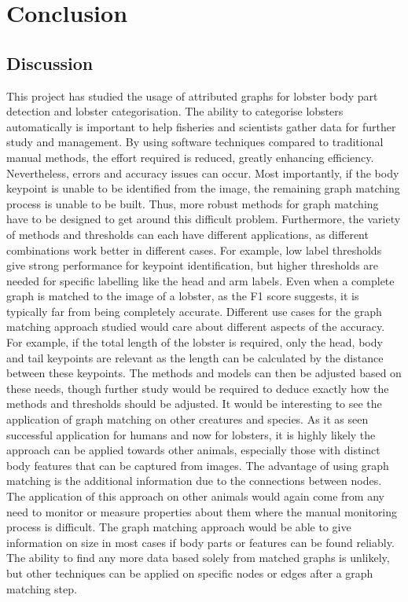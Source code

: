\section{Conclusion}
\newcommand{\comment}[1]{}

\subsection{Discussion}
This project has studied the usage of attributed graphs for lobster body part detection and lobster categorisation. The ability to categorise lobsters automatically is important to help fisheries and scientists gather data for further study and management. 
\n
By using software techniques compared to traditional manual methods, the effort required is reduced, greatly enhancing efficiency. Nevertheless, errors and accuracy issues can occur. Most importantly, if the body keypoint is unable to be identified from the image, the remaining graph matching process is unable to be built. Thus, more robust methods for graph matching have to be designed to get around this difficult problem. Furthermore, the variety of methods and thresholds can each have different applications, as different combinations work better in different cases. For example, low label thresholds give strong performance for keypoint identification, but higher thresholds are needed for specific labelling like the head and arm labels. Even when a complete graph is matched to the image of a lobster, as the F1 score suggests, it is typically far from being completely accurate. Different use cases for the graph matching approach studied would care about different aspects of the accuracy. For example, if the total length of the lobster is required, only the head, body and tail keypoints are relevant as the length can be calculated by the distance between these keypoints. The methods and models can then be adjusted based on these needs, though further study would be required to deduce exactly how the methods and thresholds should be adjusted. 
\n
It would be interesting to see the application of graph matching on other creatures and species. As it as seen successful application for humans \cite{human-pose, human-skeleton} and now for lobsters, it is highly likely the approach can be applied towards other animals, especially those with distinct body features that can be captured from images. The advantage of using graph matching is the additional information due to the connections between nodes. The application of this approach on other animals would again come from any need to monitor or measure properties about them where the manual monitoring process is difficult. The graph matching approach would be able to give information on size in most cases if body parts or features can be found reliably. The ability to find any more data based solely from matched graphs is unlikely, but other techniques can be applied on specific nodes or edges after a graph matching step. 
